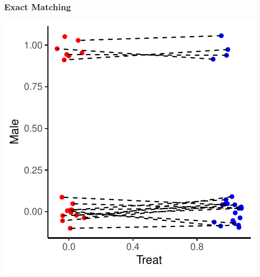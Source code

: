 \documentclass[xcolor=x11names,compress]{beamer}\usepackage[]{graphicx}\usepackage[]{color}
\makeatletter
\def\maxwidth{ %
  \ifdim\Gin@nat@width>\linewidth
    \linewidth
  \else
    \Gin@nat@width
  \fi
}
\newenvironment{knitrout}{}{} %
\renewcommand{\(}{\begin{columns}}
\renewcommand{\)}{\end{columns}}
\newcommand{\<}[1]{\begin{column}{#1}}
\renewcommand{\>}{\end{column}}
\makeatother
\begin{document}
\begin{frame}
\frametitle{Exact Matching}
\begin{center}
\begin{knitrout}
\color{fgcolor}
\includegraphics[width=\maxwidth]{figure/exact_matching_2a-1} 

\end{knitrout}
\end{center}
\end{frame}
\end{document}
